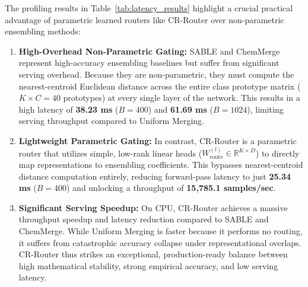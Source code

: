 The profiling results in Table~\ref{tab:latency_results} highlight a crucial practical advantage of parametric learned routers like CR-Router over non-parametric ensembling methods:
\begin{enumerate}
  \item \textbf{High-Overhead Non-Parametric Gating:} SABLE and ChemMerge represent high-accuracy ensembling baselines but suffer from significant serving overhead. Because they are non-parametric, they must compute the nearest-centroid Euclidean distance across the entire class prototype matrix ($K \times C = 40$ prototypes) at every single layer of the network. This results in a high latency of \textbf{38.23 ms} ($B=400$) and \textbf{61.69 ms} ($B=1024$), limiting serving throughput compared to Uniform Merging.
  \item \textbf{Lightweight Parametric Gating:} In contrast, CR-Router is a parametric router that utilizes simple, low-rank linear heads ($W_{\text{route}}^{(l)} \in \mathbb{R}^{K \times D}$) to directly map representations to ensembling coefficients. This bypasses nearest-centroid distance computation entirely, reducing forward-pass latency to just \textbf{25.34 ms} ($B=400$) and unlocking a throughput of \textbf{15,785.1 samples/sec}.
  \item \textbf{Significant Serving Speedup:} On CPU, CR-Router achieves a massive throughput speedup and latency reduction compared to SABLE and ChemMerge. While Uniform Merging is faster because it performs no routing, it suffers from catastrophic accuracy collapse under representational overlaps. CR-Router thus strikes an exceptional, production-ready balance between high mathematical stability, strong empirical accuracy, and low serving latency.
\end{enumerate}

